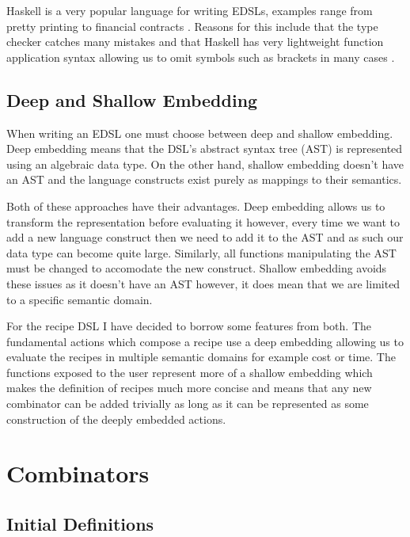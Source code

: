 \documentclass[11pt]{article}
\begin{document}
\medbreak

Haskell is a very popular language for writing EDSLs, examples
range from pretty printing \cite{pretty} to financial contracts \cite{contracts}.
Reasons for this include that the type checker catches many mistakes
and that Haskell has very lightweight function application syntax
allowing us to omit symbols such as brackets in many cases \cite{snoyman}.

\subsection{Deep and Shallow Embedding}
When writing an EDSL one must choose between deep and shallow embedding.
Deep embedding means that the DSL's abstract syntax tree (AST) is
represented using an algebraic data type. On the other hand, shallow
embedding doesn't have an AST and the language constructs exist purely
as mappings to their semantics.

\medbreak

Both of these approaches have their advantages. Deep embedding
allows us to transform the representation before evaluating
it however, every time we want to add a new language construct
then we need to add it to the AST and as such our data type
can become quite large. Similarly, all functions manipulating
the AST must be changed to accomodate the new construct. Shallow
embedding avoids these issues as it doesn't have an AST however,
it does mean that we are limited to a specific semantic domain.

\medbreak

For the recipe DSL I have decided to borrow some features from
both. The fundamental actions which compose a recipe use a
deep embedding allowing us to evaluate the recipes in multiple
semantic domains for example cost or time. The functions
exposed to the user represent more of a shallow embedding
which makes the definition of recipes much more concise and
means that any new combinator can be added trivially as long
as it can be represented as some construction of the deeply
embedded actions.

\section{Combinators}
\subsection{Initial Definitions}
\end{document}

